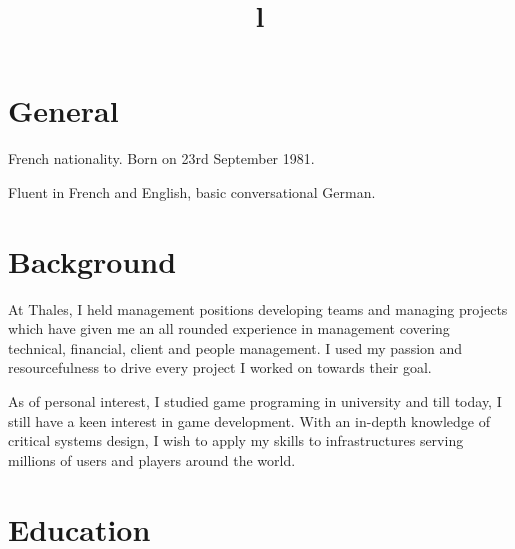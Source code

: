 \documentclass[overlapped,line,letterpaper]{res}
\begin{document}
\begin{resume}


  \section{\bf General}
  French nationality. Born on 23rd September 1981.

  Fluent in French and English, basic conversational German.


  \section{\bf Background}

  At Thales, I held management positions developing teams and managing projects
  which have given me an all rounded experience in management covering
  technical, financial, client and people management. I used my passion and
  resourcefulness to drive every project I worked on towards their goal.

  As of personal interest, I studied game programing in university and till
  today, I still have a keen interest in game development. With an in-depth
  knowledge of critical systems design, I wish to apply my skills to
  infrastructures serving millions of users and players around the world.
  


  \section{\bf Education}

  \begin{format}
    \title{l}\\
    \body\\
  \end{format}


\end{resume}
\end{document}
